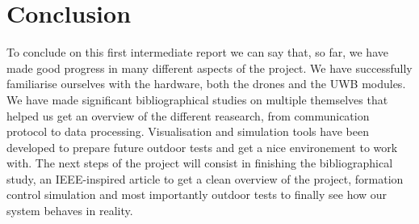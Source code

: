 \chapter*{Conclusion}

To conclude on this first intermediate report we can say that, so far, we have made good progress in many different aspects of the project. We have
successfully familiarise ourselves with the hardware, both the drones and the UWB modules. We have made significant bibliographical studies on multiple themselves
that helped us get an overview of the different reasearch, from communication protocol to data processing. Visualisation and simulation tools have been developed
to prepare future outdoor tests and get a nice environement to work with. The next steps of the project will consist in finishing the bibliographical study, an IEEE-inspired article to 
get a clean overview of the project, formation control simulation and most importantly outdoor tests to finally see how our system behaves in reality. 
